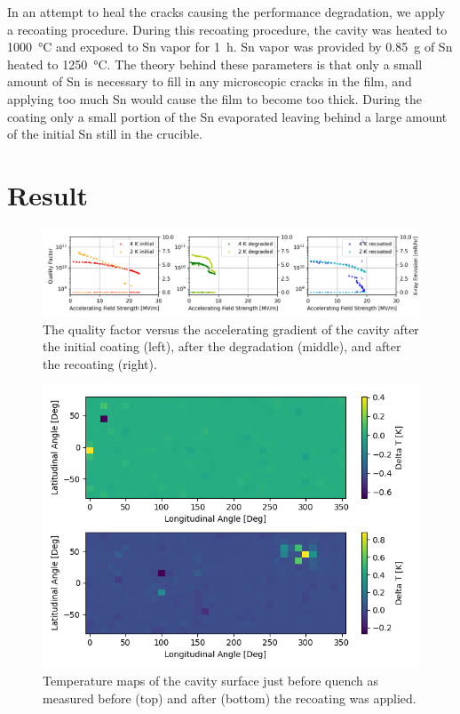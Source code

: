 \documentclass{revtex4-2}
\begin{document}
In an attempt to heal the cracks causing the performance degradation, we apply a recoating procedure. During this recoating procedure, the cavity was heated to \qty{1000}{\degreeCelsius} and exposed to Sn vapor for \qty{1}{\hour}. Sn vapor was provided by \qty{0.85}{\gram} of Sn heated to \qty{1250}{\degreeCelsius}. The theory behind these parameters is that only a small amount of Sn is necessary to fill in any microscopic cracks in the film, and applying too much Sn would cause the film to become too thick. During the coating only a small portion of the Sn evaporated leaving behind a large amount of the initial Sn still in the crucible. 

\section{Result}
\label{sec:Results}

\begin{figure}[h]%
    \centering%
    \includegraphics[width=1.0\columnwidth]{./figures/VTS.png}%
    \caption{The quality factor versus the accelerating gradient of the cavity after the initial coating (left), after the degradation (middle), and after the recoating (right).}%
    \label{fig:VTS}%
\end{figure}

\begin{figure}[h]%
    \centering%
    \includegraphics{./figures/TMAP.png}%
    \caption{Temperature maps of the cavity surface just before quench as measured before (top) and after (bottom) the recoating was applied.}%
    \label{fig:VTS}%
\end{figure}
\end{document}
